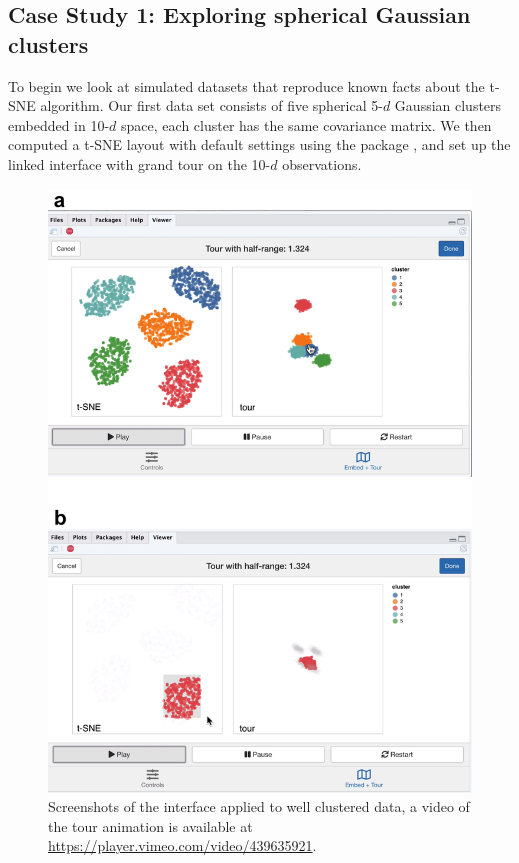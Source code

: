 \documentclass[article,notitle]{jdssv}
\begin{document}
\hypertarget{case-study-1-exploring-spherical-gaussian-clusters}{%
\subsection{Case Study 1: Exploring spherical Gaussian clusters}\label{case-study-1-exploring-spherical-gaussian-clusters}}

To begin we look at simulated datasets that reproduce known facts
about the t-SNE algorithm. Our first data set consists of five spherical 5-\(d\)
Gaussian clusters embedded in 10-\(d\) space, each cluster has the same
covariance matrix. We then computed a t-SNE layout with default settings
using the  package \citep{Rtsne},
and set up the  linked interface with grand tour on the 10-\(d\)
observations.



\begin{figure}

{\centering \includegraphics[width=\textwidth,height=0.75\textheight]{./img/liminal-screenshot-gaussian} 

}

\caption{Screenshots of the  interface applied to well clustered data, a video of the tour animation is available at \url{https://player.vimeo.com/video/439635921}.}\label{fig:gaussian}
\end{figure}
\end{document}
